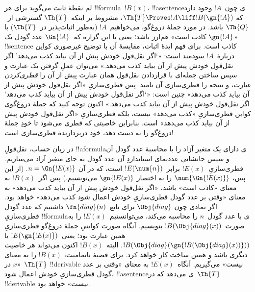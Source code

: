 \documentclass[../../../include/open-logic-section]{subfiles}
\begin{document}


\begin{explain}
لم نقطهٔ ثابت می‌گوید برای هر !!{formula}~$!B(x)$، !!a{sentence}ی
چون~$!A$ وجود دارد که
$\Th{T} \Proves !A \liff !B(\gn{!A})$، مشروط بر اینکه~$\Th{T}$
گسترشی از~$\Th{Q}$ باشد. در مورد جملهٔ دروغ‌گو، می‌خواهیم~$!A$ (به‌طور
اثبات‌پذیر در~$\Th{T}$) با «$\gn{!A}$ کاذب است» هم‌ارز باشد؛ یعنی با
این گزاره که~$\Gn{!A}$ عدد گودل یک !!{sentence} کاذب است. برای فهم
ایدهٔ اثبات، مقایسهٔ آن با توضیح غیرصوری کواین دربارهٔ~$!A$ سودمند
است: «`اگر نقل‌قول خودش پیش از آن بیاید کذب می‌دهد' اگر نقل‌قول خودش
پیش از آن بیاید کذب می‌دهد.» می‌توان عملِ گرفتن یک عبارت و سپس
ساختن جمله‌ای با قراردادن نقل‌قول همان عبارت پیش از آن را
\emph{قطری‌کردن} عبارت، و نتیجه را قطری‌سازی آن نامید. پس قطری‌سازیِ
«اگر نقل‌قول خودش پیش از آن بیاید کذب می‌دهد» چنین است: «`اگر نقل‌قول
خودش پیش از آن بیاید کذب می‌دهد' اگر نقل‌قول خودش پیش از آن بیاید کذب
می‌دهد.» اکنون توجه کنید که جملهٔ دروغ‌گوی کواین قطری‌سازیِ «کذب
می‌دهد» نیست، بلکه قطری‌سازیِ «اگر نقل‌قول خودش پیش از آن بیاید کذب
می‌دهد» است. بنابراین خاصیتی که قطری می‌شود تا خودِ جملهٔ دروغ‌گو را
به دست دهد، خود دربردارندهٔ قطری‌سازی است!{}

در زبان حساب، نقل‌قولِ !!a{formula}ی دارای یک متغیر آزاد را با محاسبهٔ
عدد گودل آن و سپس جانشانی عددنمای استانداردِ آن عدد گودل به جای متغیر
آزاد می‌سازیم. قطری‌سازیِ~$!E(x)$ برابر~$!E(\num{n})$ است، که در آن
$n = \Gn{!E(x)}$. (از این پس، $\num{\Gn{!E(x)}}$ را به اختصار
$\gn{!E(x)}$ می‌نویسیم.) پس اگر~$!B(x)$ به معنای «کاذب است» باشد،
«اگر نقل‌قول خودش پیش از آن بیاید کذب می‌دهد» به معنای «وقتی بر عدد
گودل قطری‌سازیِ خودش اعمال شود کذب می‌دهد» خواهد بود. اگر نمادی چون
$\Obj{diag}$ برای تابع~$\fn{diag}(n)$ داشتیم که عدد گودل قطری‌سازیِ
!!{formula}ی با عدد گودل~$n$ را محاسبه می‌کند، می‌توانستیم~$!E(x)$ را
به صورت~$!B(\Obj{diag}(x))$ بنویسیم. آنگاه صورت کواینیِ جملهٔ دروغ‌گو
قطری‌سازیِ همین عبارت بود؛ یعنی~$!E(\gn{!E(x)})$ یا
$!B(\Obj{diag}(\gn{!B(\Obj{diag}(x))}))$. البته~$!B(x)$ اکنون
می‌تواند هر خاصیت دیگری باشد و همین ساخت کار خواهد کرد. برای قضیهٔ
ناتمامیت، $!B(x)$ را به معنای «$x$ در~$\Th{T}$ !!{derivable} نیست»
می‌گیریم. آنگاه~$!E(x)$ به معنای «وقتی بر عدد گودل قطری‌سازیِ خودش
اعمال شود، !!a{sentence}ی می‌دهد که در~$\Th{T}$ !!{derivable} نیست»
خواهد بود.


\end{explain}
\end{document}
